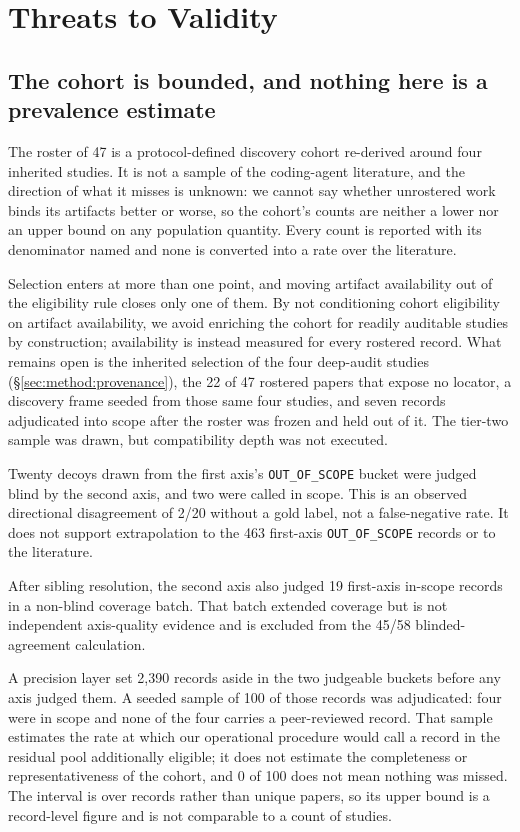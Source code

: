 \section{Threats to Validity}
\label{sec:threats}

\subsection{The cohort is bounded, and nothing here is a prevalence estimate}

The roster of 47 is a protocol-defined discovery cohort re-derived around four inherited
studies. It is not a sample of the coding-agent literature, and the direction of what it
misses is unknown: we cannot say whether unrostered work binds its artifacts better or
worse, so the cohort's counts are neither a lower nor an upper bound on any population
quantity. Every count is reported with its denominator named and none is converted into a
rate over the literature.

Selection enters at more than one point, and moving artifact availability out of the
eligibility rule closes only one of them. By not conditioning cohort eligibility on artifact
availability, we avoid enriching the cohort for readily auditable studies by construction;
availability is instead measured for every rostered record. What remains open is the
inherited selection of the four deep-audit studies (\S\ref{sec:method:provenance}), the 22
of 47 rostered papers that expose no locator, a discovery frame seeded from those same four
studies, and seven records adjudicated into scope after the roster was frozen and held out of
it. The tier-two sample was drawn, but compatibility depth was not executed.

Twenty decoys drawn from the first axis's \texttt{OUT\_OF\_SCOPE} bucket were judged blind by the second
axis, and two were called in scope. This is an observed directional disagreement of 2/20
without a gold label, not a false-negative rate. It does not support extrapolation to the
463 first-axis \texttt{OUT\_OF\_SCOPE} records or to the literature.

After sibling resolution, the second axis also judged 19 first-axis in-scope records in a
non-blind coverage batch. That batch extended coverage but is not independent axis-quality
evidence and is excluded from the 45/58 blinded-agreement calculation.

A precision layer set 2{,}390 records aside in the two judgeable buckets before any axis
judged them. A seeded sample of 100 of those records was adjudicated: four were in scope and
none of the four carries a peer-reviewed record. That sample estimates the rate at which our
operational procedure would call a record in the residual pool additionally eligible; it does
not estimate the completeness or representativeness of the cohort, and 0 of 100 does not mean
nothing was missed. The interval is over records rather than unique papers, so its upper
bound is a record-level figure and is not comparable to a count of studies.

